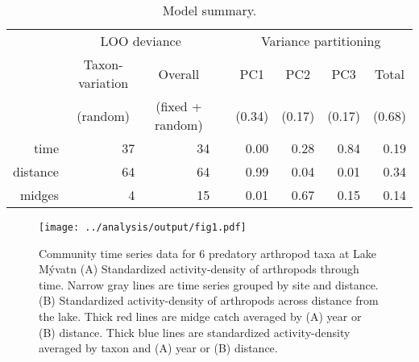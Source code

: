 \documentclass[12pt]{article}
\begin{document}

%
% 






\newpage{}



\clearpage

\begin{table}
\caption{\label{fig:obs-data}Model summary.}
\begin{tabular}{rrrrrrrr}
\toprule
 & \multicolumn{2}{c}{LOO deviance} & & \multicolumn{4}{c}{Variance partitioning} \\
 \cmidrule{2-3} \cmidrule{5-8}
 & \multicolumn{1}{c}{Taxon-variation} & \multicolumn{1}{c}{Overall} & &
    \multicolumn{1}{c}{PC1} & \multicolumn{1}{c}{PC2} & \multicolumn{1}{c}{PC3} &
    \multicolumn{1}{c}{Total} \\
& \multicolumn{1}{c}{(random)} & \multicolumn{1}{c}{(fixed + random)} & &
    \multicolumn{1}{c}{(0.34)} & \multicolumn{1}{c}{(0.17)} &
    \multicolumn{1}{c}{(0.17)} & \multicolumn{1}{c}{(0.68)} \\
\midrule
time & 37 & 34 &  & 0.00 & 0.28 & 0.84 & 0.19\\
distance & 64 & 64 &  & 0.99 & 0.04 & 0.01 & 0.34\\
midges & 4 & 15 &  & 0.01 & 0.67 & 0.15 & 0.14\\
\bottomrule
\end{tabular}
\end{table}


\clearpage

\begin{figure}
\centering
\texttt{[image: ../analysis/output/fig1.pdf]}
\caption{\label{fig:obs-data}
Community time series data for 6 predatory arthropod taxa at Lake M\'{y}vatn
(A) Standardized activity-density of arthropods through time.
Narrow gray lines are time series grouped by site and distance.
(B) Standardized activity-density of arthropods across distance from the lake.
Thick red lines are midge catch averaged by (A) year or (B) distance.
Thick blue lines are standardized activity-density averaged by taxon and
(A) year or (B) distance.
}
\end{figure}
\end{document}
